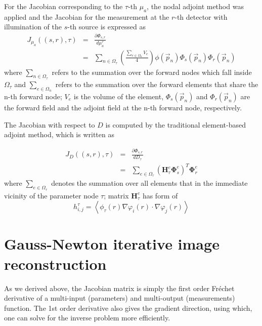 \documentclass[12pt]{book}               %
\begin{document}
For the Jacobian corresponding to the $\tau$-th $\mu_a$, the nodal
adjoint method was applied and the Jacobian for the measurement at
the $r$-th detector with illumination of the $s$-th source is
expressed as
\begin{eqnarray}\nonumber
J_{\mu_a}((s,r),\tau)&=&\frac{\partial
\Phi_{s,r}}{d\mu_a^{\tau}}\\&=&\sum_{n\in\Omega_\tau}\left(\frac{\sum_{e\in\Omega_n}
V_e}{4}\right)\phi(\vec{p}_n)\Phi_s(\vec{p}_n)\Phi_r(\vec{p}_n)
\end{eqnarray}
where $\sum_{n\in\Omega_\tau}$ refers to the summation over the
forward nodes which fall inside $\Omega_\tau$ and
$\sum_{e\in\Omega_n}$ refers to the summation over the forward
elements that share the n-th forward node; $V_e$ is the volume of
the element, $\Phi_s(\vec{p}_n)$ and $\Phi_r(\vec{p}_n)$ are the
forward field and the adjoint field at the n-th forward node,
respectively.

The Jacobian with respect to $D$ is computed by the traditional
element-based adjoint method, which is written as

\begin{eqnarray}\nonumber
J_{D}((s,r),\tau)&=&\frac{\partial
\Phi_{s,r}}{dD_{\tau}}\\&=&\sum_{e\in\Omega_\tau}\left(\mathbf{H}_\tau^e{\boldsymbol\Phi}_s^e\right)^T{\boldsymbol\Phi}_r^e
\end{eqnarray}
where $\sum_{e\in\Omega_\tau}$ denotes the summation over all
elements that in the immediate vicinity of the parameter node $\tau$;
matrix $\mathbf{H}_\tau^e$ has form of
\begin{equation}
h^\tau_{i,j}=\left\langle
\phi_\tau(r)\nabla\varphi_i(r)\cdot\nabla\varphi_j(r)\right\rangle
\end{equation}

\section{Gauss-Newton iterative image reconstruction}
As we derived above, the Jacobian matrix is simply the first order Fr\'echet derivative of a multi-input (parameters) and multi-output (measurements) function. The 1st order derivative also gives the gradient direction, using which, one can solve for the inverse problem more efficiently.
\end{document}
